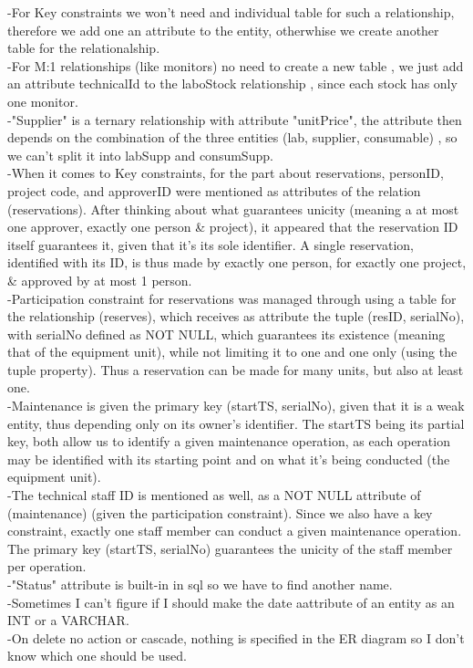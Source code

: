 \documentclass[a4paper,12pt]{article}
\begin{document}
-For Key constraints we won't need and individual table for such a relationship, therefore we add one an attribute to the entity, otherwhise we create another table for the relationalship.\\
-For M:1 relationships (like monitors) no need to create a new table , we just add an attribute technicalId to the laboStock relationship , since each stock has only one monitor.\\
-"Supplier" is a  ternary relationship with attribute "unitPrice", the attribute then depends on the combination of the three entities (lab, supplier, consumable) , so we can't split it into labSupp and consumSupp.\\
-When it comes to Key constraints, for the part about reservations, personID, project code, and approverID were mentioned as attributes of the relation (reservations). After thinking about what guarantees unicity (meaning a at most one approver, exactly one person & project), it appeared that the reservation ID itself guarantees it, given that it's its sole identifier. A single reservation, identified with its ID, is thus made by exactly one person, for exactly one project, & approved by at most 1 person.\\
-Participation constraint for reservations was managed through using a table for the relationship (reserves), which receives as attribute the tuple (resID, serialNo), with serialNo defined as NOT NULL, which guarantees its existence (meaning that of the equipment unit), while not limiting it to one and one only (using the tuple property). Thus a reservation can be made for many units, but also at least one.\\
-Maintenance is given the primary key (startTS, serialNo), given that it is a weak entity, thus depending only on its owner's identifier. The startTS being its partial key, both allow us to identify a given maintenance operation, as each operation may be identified with its starting point and on what it's being conducted (the equipment unit).\\
-The technical staff ID is mentioned as well, as a NOT NULL attribute of (maintenance) (given the participation constraint). Since we also have a key constraint, exactly one staff member can conduct a given maintenance operation. The primary key (startTS, serialNo) guarantees the unicity of the staff member per operation.\\
-"Status" attribute is built-in in sql so we have to find another name.\\
-Sometimes I can't figure if I should make the date aattribute of an entity as an INT or a VARCHAR.\\
-On delete no action or cascade, nothing is specified in the ER diagram so I don't know which one should be used.\\
\end{document}
